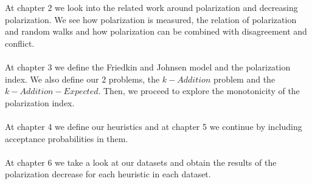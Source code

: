 At chapter 2 we look into the related work around polarization and decreasing polarization. We see how polarization is measured, the relation of polarization and random walks and how polarization can be combined with disagreement and conflict. 
\\
\\
At chapter 3 we define the Friedkin and Johnsen model and the polarization index. We also define our 2 problems, the $k-Addition$ problem and the $k-Addition-Expected$. Then, we proceed to explore the monotonicity of the polarization index.
\\
\\
At chapter 4 we define our heuristics and at chapter 5 we continue by including acceptance probabilities in them.
\\
\\
At chapter 6 we take a look at our datasets and obtain the results of the polarization decrease for each heuristic in each dataset. 




